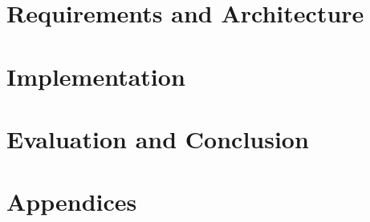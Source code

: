 \documentclass[12pt, a4paper]{article}
\begin{document}


\part{Requirements and Architecture}





\part{Implementation}









\part{Evaluation and Conclusion}




\nocite{methodology}
 

\newpage
\part{Appendices}
\appendix 



\end{document}
